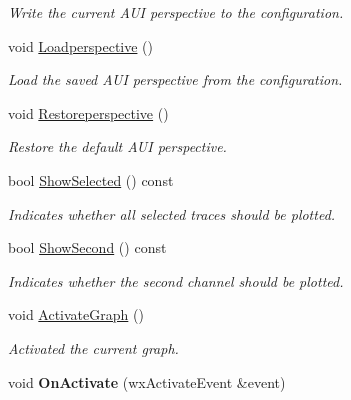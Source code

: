 \begin{DoxyCompactItemize}
\begin{DoxyCompactList}\small\item\em Write the current AUI perspective to the configuration. \item\end{DoxyCompactList}\item 
\hypertarget{classwxStfChildFrame_a5e3b3b5ed6f0e91542051a7320ee3fb5}{
void \hyperlink{classwxStfChildFrame_a5e3b3b5ed6f0e91542051a7320ee3fb5}{Loadperspective} ()}
\label{classwxStfChildFrame_a5e3b3b5ed6f0e91542051a7320ee3fb5}

\begin{DoxyCompactList}\small\item\em Load the saved AUI perspective from the configuration. \item\end{DoxyCompactList}\item 
\hypertarget{classwxStfChildFrame_a9ca8d5334433e39f014a399b26589d32}{
void \hyperlink{classwxStfChildFrame_a9ca8d5334433e39f014a399b26589d32}{Restoreperspective} ()}
\label{classwxStfChildFrame_a9ca8d5334433e39f014a399b26589d32}

\begin{DoxyCompactList}\small\item\em Restore the default AUI perspective. \item\end{DoxyCompactList}\item 
bool \hyperlink{classwxStfChildFrame_a6d956a35f7e01c0bf18ca1409b5f50e0}{ShowSelected} () const 
\begin{DoxyCompactList}\small\item\em Indicates whether all selected traces should be plotted. \item\end{DoxyCompactList}\item 
bool \hyperlink{classwxStfChildFrame_aeab6592a78f2b567c46b716dbbdcac70}{ShowSecond} () const 
\begin{DoxyCompactList}\small\item\em Indicates whether the second channel should be plotted. \item\end{DoxyCompactList}\item 
\hypertarget{classwxStfChildFrame_a0186c699805f1f99befae295f864bcbe}{
void \hyperlink{classwxStfChildFrame_a0186c699805f1f99befae295f864bcbe}{ActivateGraph} ()}
\label{classwxStfChildFrame_a0186c699805f1f99befae295f864bcbe}

\begin{DoxyCompactList}\small\item\em Activated the current graph. \item\end{DoxyCompactList}\item 
\hypertarget{classwxStfChildFrame_ac12d539c58c7826a616b259d345859e6}{
void {\bfseries OnActivate} (wxActivateEvent \&event)}
\label{classwxStfChildFrame_ac12d539c58c7826a616b259d345859e6}

\end{DoxyCompactItemize}



